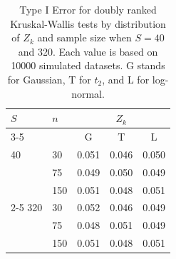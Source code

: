 \documentclass[12pt]{article}
\theoremstyle{plain}
\begin{document}
\begin{table}
	\centering
	\caption{Type I Error for doubly ranked Kruskal-Wallis tests by distribution of $Z_k$ and sample size when $S = 40$ and 320. Each value is based on 10000 simulated datasets. G stands for Gaussian, T for $t_2$, and L for log-normal. \label{t:kwe}}
	\begin{tabular}{llccc}
		  \hline
		\multirow{2}{*}{$S$} & \multirow{2}{*}{$n$} &  \multicolumn{3}{c}{$Z_k$} \\
		  \cline{3-5}
		  &  & G &  T & L \\ 
		  \hline
		  40 & 30 & 0.051 & 0.046 & 0.050   \\
		 & 75 & 0.049  & 0.050 & 0.049   \\
		 & 150 & 0.051 & 0.048 & 0.051 \\
		\cline{2-5}
		320 &  30  & 0.052 & 0.046 & 0.049   \\
		 & 75  & 0.048 & 0.051 & 0.049   \\
		 & 150 & 0.051 & 0.048 & 0.051 \\
		    \hline
	\end{tabular}
\end{table}

\end{document}
